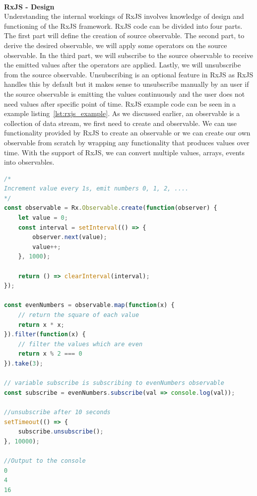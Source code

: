 \leavevmode
\\
\textbf{RxJS - Design}
\\
Understanding the internal workings of RxJS involves knowledge of design and functioning of the RxJS framework. RxJS code can be divided into four parts. The first part will define the creation of source observable. The second part, to derive the desired observable, we will apply some operators on the source observable. In the third part, we will subscribe to the source observable to receive the emitted values after the operators are applied. Lastly, we will unsubscribe from the source observable. Unsubscribing is an optional feature in RxJS as RxJS handles this by default but it makes sense to unsubscribe manually by an user if the source observable is emitting the values continuously and the user does not need values after specific point of time. RxJS example code can be seen in a example listing~\ref{lst:rxjs_example}. As we discussed earlier, an observable is a collection of data stream, we first need to create and observable. We can use functionality provided by RxJS to create an observable or we can create our own observable from scratch by wrapping any functionality that produces values over time. With the support of RxJS, we can convert multiple values, arrays, events into observables. 

\begin{lstlisting}[language=JavaScript, caption=RxJS example, label={lst:rxjs_example}]
/*
Increment value every 1s, emit numbers 0, 1, 2, ....
*/
const observable = Rx.Observable.create(function(observer) {
    let value = 0;
    const interval = setInterval(() => {
        observer.next(value);
        value++;
    }, 1000);

    return () => clearInterval(interval);
});

const evenNumbers = observable.map(function(x) {
	// return the square of each value
    return x * x;
}).filter(function(x) {
	// filter the values which are even
    return x % 2 === 0
}).take(3);

// variable subscribe is subscribing to evenNumbers observable
const subscribe = evenNumbers.subscribe(val => console.log(val));

//unsubscribe after 10 seconds
setTimeout(() => {
	subscribe.unsubscribe();
}, 10000);

//Output to the console
0
4
16
\end{lstlisting}

